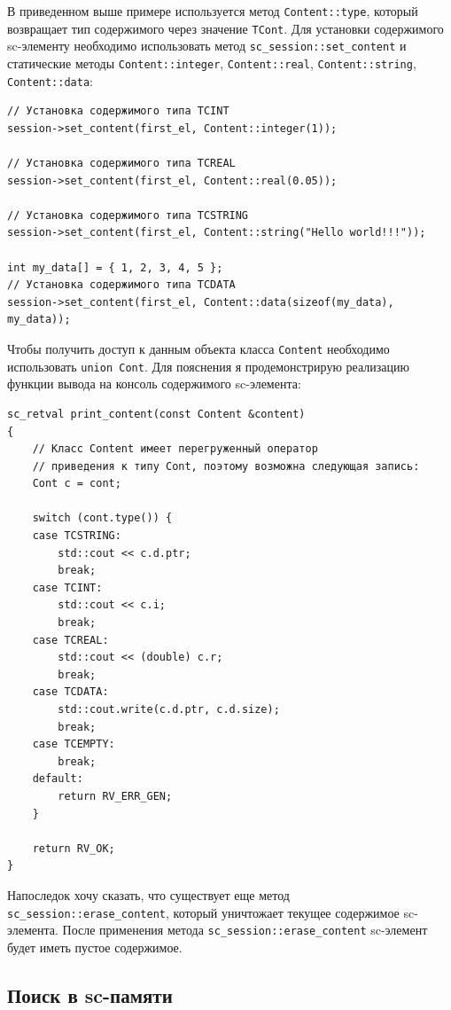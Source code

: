 В приведенном выше примере используется метод
\lstinline|Content::type|, который возвращает тип содержимого через
значение \lstinline|TCont|. Для установки содержимого sc-элементу
необходимо использовать метод \lstinline|sc_session::set_content| и
статические методы \lstinline|Content::integer|,
\lstinline|Content::real|, \lstinline|Content::string|,
\lstinline|Content::data|:
\begin{lstlisting}[texcl]
// Установка содержимого типа TCINT
session->set_content(first_el, Content::integer(1));

// Установка содержимого типа TCREAL
session->set_content(first_el, Content::real(0.05));

// Установка содержимого типа TCSTRING
session->set_content(first_el, Content::string("Hello world!!!"));

int my_data[] = { 1, 2, 3, 4, 5 };
// Установка содержимого типа TCDATA
session->set_content(first_el, Content::data(sizeof(my_data), my_data));
\end{lstlisting}

Чтобы получить доступ к данным объекта класса \lstinline|Content|
необходимо использовать \lstinline|union Cont|. Для пояснения я
продемонстрирую реализацию функции вывода на консоль содержимого
sc-элемента:
\begin{lstlisting}[texcl]
sc_retval print_content(const Content &content)
{
    // Класс Content имеет перегруженный оператор
    // приведения к типу Cont, поэтому возможна следующая запись:
    Cont c = cont;

    switch (cont.type()) {
    case TCSTRING:
        std::cout << c.d.ptr;
        break;
    case TCINT:
        std::cout << c.i;
        break;
    case TCREAL:
        std::cout << (double) c.r;
        break;
    case TCDATA:
        std::cout.write(c.d.ptr, c.d.size);
        break;
    case TCEMPTY:
        break;
    default:
        return RV_ERR_GEN;
    }

    return RV_OK;
}
\end{lstlisting}

Напоследок хочу сказать, что существует еще метод
\lstinline|sc_session::erase_content|, который уничтожает текущее
содержимое sc-элемента. После применения метода
\lstinline|sc_session::erase_content| sc-элемент будет иметь пустое
содержимое.

\subsection{Поиск в sc-памяти}
